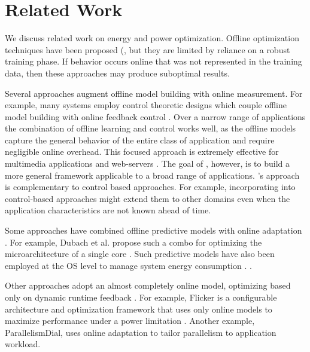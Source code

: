 \section{Related Work}
\label{sec:related}
We discuss related work on energy and power optimization. Offline optimization techniques have been proposed (\eg \cite{Yi2003,LeeBrooks2006,CPR,ChenJohn2011,petabricksStatic}, but
they are limited by reliance on a robust training phase.  If behavior
occurs online that was not represented in the training data, then
these approaches may produce suboptimal results.

Several approaches augment offline model building with online
measurement.  For example, many systems employ control theoretic
designs which couple offline model building with online feedback
control
\cite{Wu2004,TCST,Chen2011,PTRADE,Heartbeats2,ControlWare,Agilos,Rajkumar,Sojka,Raghavendra2008}.
Over a narrow range of applications the combination of offline
learning and control works well, as the offline models capture the
general behavior of the entire class of application and require
negligible online overhead.  This focused approach is extremely
effective for multimedia applications
\cite{grace2,flinn99,flinn2004,xtune,TCST} and web-servers
\cite{Horvarth,LuEtAl-2006a,SunDaiPan-2008a}.  The goal of \SYSTEMLEO{},
however, is to build a more general framework applicable to a broad
range of applications.  \SYSTEMLEO{}'s approach is complementary to
control based approaches.  For example, incorporating \SYSTEMLEO{} into
control-based approaches might extend them to other domains even when
the application characteristics are not known ahead of time.

Some approaches have combined offline predictive models with online
adaptation
\cite{Zhang2012,packandcap,Winter2010,dubach2010,Koala,Cinder, wu2012inferred}.  For
example, Dubach et al.  propose such a combo for optimizing the
microarchitecture of a single core \cite{dubach2010}.  Such predictive
models have also been employed at the OS level to manage system energy
consumption \cite{Koala,Cinder}. \cite{wu2012inferred}.

Other approaches adopt an almost completely online model, optimizing
based only on dynamic runtime feedback
\cite{Li2006,Flicker,ParallelismDial,Ponamarev,petabricksDynamic,LeeBrooks}.
For example, Flicker is a configurable architecture and optimization
framework that uses only online models to maximize performance under a
power limitation \cite{Flicker}.  Another example, ParallelismDial,
uses online adaptation to tailor parallelism to application workload.


